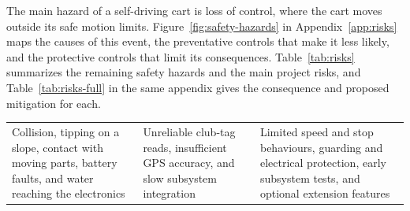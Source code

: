 
The main hazard of a self-driving cart is loss of control, where the cart moves outside its safe motion limits. Figure~\ref{fig:safety-hazards} in Appendix~\ref{app:risks} maps the causes of this event, the preventative controls that make it less likely, and the protective controls that limit its consequences. Table~\ref{tab:risks} summarizes the remaining safety hazards and the main project risks, and Table~\ref{tab:risks-full} in the same appendix gives the consequence and proposed mitigation for each.

\begin{TableBlock}
\small
{}\label{tab:risks}
\begin{tabularx}{\linewidth}{@{}YYY@{}}
 &  &  \\
\midrule
Collision, tipping on a slope, contact with moving parts, battery faults, and water reaching the electronics & Unreliable club-tag reads, insufficient GPS accuracy, and slow subsystem integration & Limited speed and stop behaviours, guarding and electrical protection, early subsystem tests, and optional extension features \\
\bottomrule
\end{tabularx}
\end{TableBlock}
